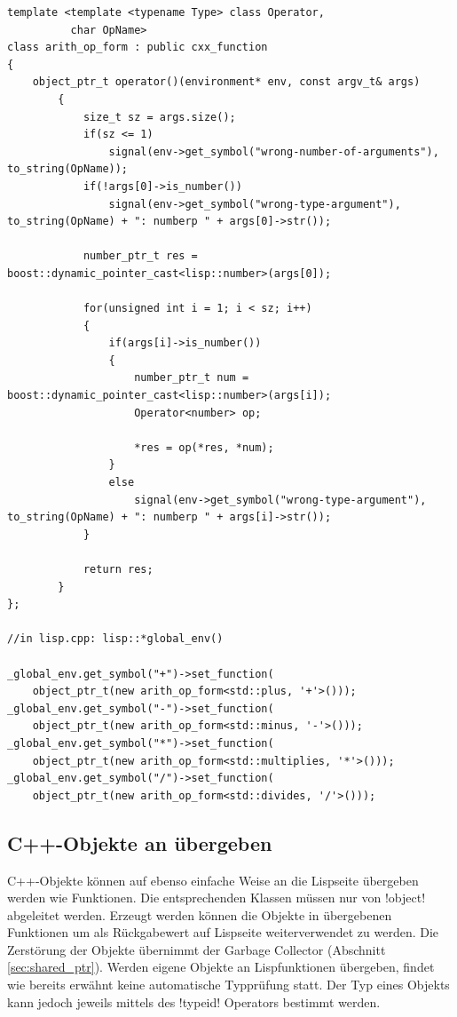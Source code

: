 \begin{lstlisting}[caption={Arithmetische Operatoren an Lisp übergeben}, label=lst:cxx_function]
template <template <typename Type> class Operator,
          char OpName>
class arith_op_form : public cxx_function
{
    object_ptr_t operator()(environment* env, const argv_t& args)
        {
            size_t sz = args.size();
            if(sz <= 1)
                signal(env->get_symbol("wrong-number-of-arguments"), to_string(OpName));
            if(!args[0]->is_number())
                signal(env->get_symbol("wrong-type-argument"), to_string(OpName) + ": numberp " + args[0]->str());

            number_ptr_t res = boost::dynamic_pointer_cast<lisp::number>(args[0]);

            for(unsigned int i = 1; i < sz; i++)
            {
                if(args[i]->is_number())
                {
                    number_ptr_t num = boost::dynamic_pointer_cast<lisp::number>(args[i]);
                    Operator<number> op;

                    *res = op(*res, *num);
                }
                else
                    signal(env->get_symbol("wrong-type-argument"), to_string(OpName) + ": numberp " + args[i]->str());
            }

            return res;
        }
};

//in lisp.cpp: lisp::*global_env()

_global_env.get_symbol("+")->set_function(
    object_ptr_t(new arith_op_form<std::plus, '+'>()));
_global_env.get_symbol("-")->set_function(
    object_ptr_t(new arith_op_form<std::minus, '-'>()));
_global_env.get_symbol("*")->set_function(
    object_ptr_t(new arith_op_form<std::multiplies, '*'>()));
_global_env.get_symbol("/")->set_function(
    object_ptr_t(new arith_op_form<std::divides, '/'>()));
\end{lstlisting}

\subsection{C++-Objekte an \projectname{} übergeben}
\label{sec:cxx_object_interface}

C++-Objekte können auf ebenso einfache Weise an die Lispseite übergeben werden wie Funktionen. Die entsprechenden Klassen müssen nur von !object! abgeleitet werden. Erzeugt werden können die Objekte in übergebenen Funktionen um als Rückgabewert auf Lispseite weiterverwendet zu werden. Die Zerstörung der Objekte übernimmt der Garbage Collector (Abschnitt \ref{sec:shared_ptr}). Werden eigene Objekte an Lispfunktionen übergeben, findet wie bereits erwähnt keine automatische Typprüfung statt. Der Typ eines Objekts kann jedoch jeweils mittels des !typeid! Operators bestimmt werden.
